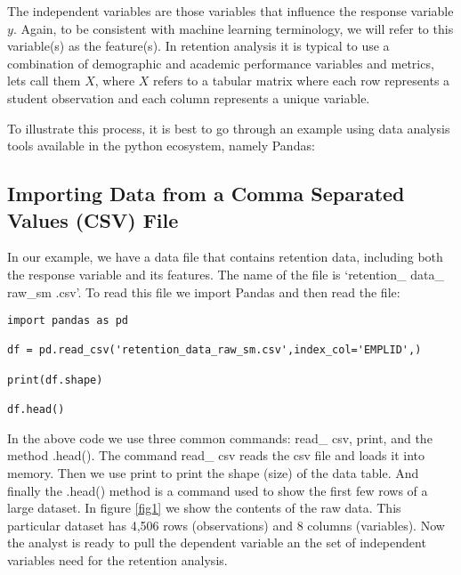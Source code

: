 \documentclass[12pt,a4paper,oneside]{book}
\begin{document}
\par The independent variables are those variables that influence the response variable $y$. Again, to be consistent with machine learning terminology, we will refer to this variable(s) as the feature(s). In retention analysis it is typical to use a combination of demographic and academic performance variables and metrics, lets call them $X$, where $X$ refers to a tabular matrix where each row represents a student observation and each column represents a unique variable.

\par To illustrate this process, it is best to go through an example using data analysis tools available in the python ecosystem, namely Pandas:

\subsection{Importing Data from a Comma Separated Values (CSV) File} 

In our example, we have a data file that contains retention data, including both the response variable and its features. The name of the file is `retention\_ data\_ raw\_sm .csv'. To read this file we import Pandas and then read the file:


\lstset{language=Python}
\lstset{frame=lines}
\begin{lstlisting}
import pandas as pd

df = pd.read_csv('retention_data_raw_sm.csv',index_col='EMPLID',)

print(df.shape)

df.head()
\end{lstlisting}

In the above code we use three common commands: read\_ csv, print, and the method .head(). The command read\_ csv reads the csv file and loads it into memory. Then we use print to print the shape (size) of the data table. And finally the .head() method is a command used to show the first few rows of a large dataset. In figure \ref{fig1} we show the contents of the raw data. This particular dataset has 4,506 rows (observations) and 8 columns (variables). Now the analyst is ready to pull the dependent variable an the set of independent variables need for the retention analysis.
\end{document}

